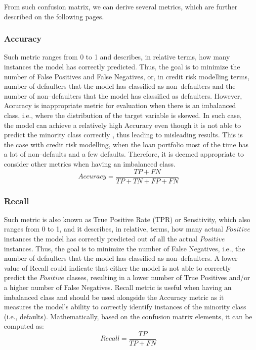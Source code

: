 From such confusion matrix, we can derive several metrics, which are further described on the following pages.

\subsubsection{Accuracy}
Such metric ranges from 0 to 1 and describes, in relative terms, how many instances the model has correctly predicted. Thus, the goal is to minimize the number of False Positives and False Negatives, or, in credit risk modelling terms, number of defaulters that the model has classified as non--defaulters and the number of non--defaulters that the model has classified as defaulters.
However, Accuracy is inappropriate metric for evaluation when there is an imbalanced class, i.e., where the distribution of the target variable is skewed.
In such case, the model can achieve a relatively high Accuracy even though it is not able to predict the minority class correctly \citep{brownlee2021failure}, thus leading to misleading results.
This is the case with credit risk modelling, when the loan portfolio most of the time has a lot of non--defaults and a few defaults.
Therefore, it is deemed appropriate to consider other metrics when having an imbalanced class.
\begin{equation}\label{eq}
Accuracy = \frac{TP + FN}{TP + TN + FP + FN}
\end{equation}


\subsubsection{Recall}
\label{subsubsec:recall}
Such metric is also known as True Positive Rate (TPR) or Sensitivity, which also ranges from 0 to 1, and it describes, in relative, terms, how many actual $Positive$ instances the model has correctly predicted out of all the actual $Positive$ instances. Thus, the goal is to minimize the number of False Negatives, i.e., the number of defaulters that the model has classified as non--defaulters.
A lower value of Recall could indicate that either the model is not able to correctly predict the $Positive$ classes, resulting in a lower number of True Positives and/or a higher number of False Negatives.
Recall metric is useful when having an imbalanced class and should be used alongside the Accuracy metric as it measures the model's ability to correctly identify instances of the minority class (i.e., defaults).
Mathematically, based on the confusion matrix elements, it can be computed as:
\begin{equation}\label{eq}
     Recall = \frac{TP}{TP + FN}
\end{equation}


